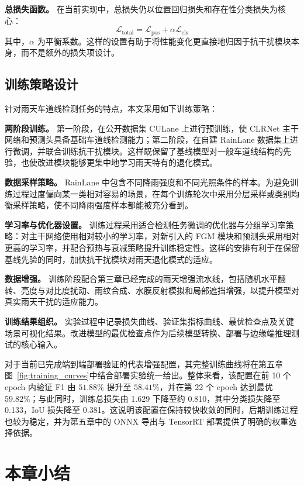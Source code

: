 \textbf{总损失函数。} 在当前实现中，总损失仍以位置回归损失和存在性分类损失为核心：
\begin{equation}
	\mathcal{L}_{\text{total}} = \mathcal{L}_{\text{pos}} + \alpha \mathcal{L}_{\text{cls}}
\end{equation}
其中，$\alpha$ 为平衡系数。这样的设置有助于将性能变化更直接地归因于抗干扰模块本身，而不是额外的损失项设计。

\subsection{训练策略设计}

针对雨天车道线检测任务的特点，本文采用如下训练策略：

\textbf{两阶段训练。} 第一阶段，在公开数据集 CULane 上进行预训练，使 CLRNet 主干网络和预测头具备基础车道线检测能力；第二阶段，在自建 RainLane 数据集上进行微调，并联合训练抗干扰模块。这样既保留了基线模型对一般车道线结构的先验，也使改进模块能够更集中地学习雨天特有的退化模式。

\textbf{数据采样策略。} RainLane 中包含不同降雨强度和不同光照条件的样本。为避免训练过程过度偏向某一类相对容易的场景，在每个训练轮次中采用分层采样或类别均衡采样策略，使不同降雨强度样本都能被充分看到。

\textbf{学习率与优化器设置。} 训练过程采用适合检测任务微调的优化器与分组学习率策略：对主干网络使用相对较小的学习率，对新引入的 FGM 模块和预测头采用相对更高的学习率，并配合预热与衰减策略提升训练稳定性。这样的安排有利于在保留基线先验的同时，加快抗干扰模块对雨天退化模式的适应。

\textbf{数据增强。} 训练阶段配合第三章已经完成的雨天增强流水线，包括随机水平翻转、亮度与对比度扰动、雨纹合成、水膜反射模拟和局部遮挡增强，以提升模型对真实雨天干扰的适应能力。

\textbf{训练结果组织。} 实验过程中记录损失曲线、验证集指标曲线、最优检查点及关键场景可视化结果。改进模型的最优检查点作为后续模型转换、部署与边缘端推理测试的核心输入。

对于当前已完成端到端部署验证的代表增强配置，其完整训练曲线将在第五章图~\ref{fig:training_curves}中结合部署实验统一给出。整体来看，该配置在前 10 个 epoch 内验证 F1 由 $51.88\%$ 提升至 $58.41\%$，并在第 22 个 epoch 达到最优 $59.82\%$；与此同时，训练总损失由 1.629 下降至约 0.810，其中分类损失降至 0.133，IoU 损失降至 0.381。这说明该配置在保持较快收敛的同时，后期训练过程也较为稳定，并为第五章中的 ONNX 导出与 TensorRT 部署提供了明确的权重选择依据。

\section{本章小结}
\label{sec:summary_4}

